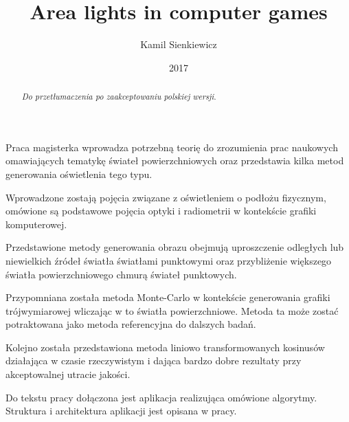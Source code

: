\documentclass[pl]{minipw/minipw}
\title{Area lights in computer games}
\author{Kamil Sienkiewicz}
\date{2017}
\begin{document}
\sloppy
\setcounter{page}{1}

\begin{streszczenie}


Praca magisterka wprowadza potrzebną teorię do zrozumienia prac naukowych omawiających tematykę świateł powierzchniowych oraz przedstawia kilka metod generowania oświetlenia tego typu.

Wprowadzone zostają pojęcia związane z oświetleniem o podłożu fizycznym, omówione są podstawowe pojęcia optyki i radiometrii w kontekście grafiki komputerowej. 

Przedstawione metody generowania obrazu obejmują uproszczenie odległych lub niewielkich źródeł światła światłami punktowymi oraz przybliżenie większego światła powierzchniowego chmurą świateł punktowych.

Przypomniana została metoda Monte-Carlo w kontekście generowania grafiki trójwymiarowej wliczając w to światła powierzchniowe. Metoda ta może zostać potraktowana jako metoda referencyjna do dalszych badań.

Kolejno została przedstawiona metoda liniowo transformowanych kosinusów działająca w czasie rzeczywistym i dająca bardzo dobre rezultaty przy akceptowalnej utracie jakości.

Do tekstu pracy dołączona jest aplikacja realizująca omówione algorytmy. Struktura i architektura aplikacji jest opisana w pracy.
\end{streszczenie}

\begin{abstract}
\textit{Do przetłumaczenia po zaakceptowaniu polskiej wersji.}
\end{abstract}

\makestatement

\tableofcontents


\pagestyle{fancy}










\begin{appendices}

\end{appendices}

\printbibliography
\end{document}
